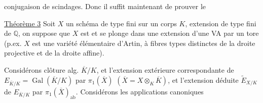 conjugaison de scindages. Donc il suffit maintenant de prouver le

\uline{Théorème 3} Soit $X$ un schéma de type fini sur un corps $K$, extension de type fini de $\mathbb Q$, on suppose que $X$ est   et se plonge dans une extension d'une VA par un tore (p.ex. $X$ est une variété élémentaire d'Artin, à fibres types  distinctes de la droite projective et de la droite affine).


Considérons   clôture alg. $\overline K/K$, et  l'extension extérieure correspondante  de $E_{\overline K/K}=\operatorname{Gal}(\overline K/K)$ par $\pi_1(\overline X)$ $(\overline X=X\otimes_K\overline K)$, et l'extension déduite $\widetilde E_{X/K}$ de $E_{\overline K/K}$ par $\pi_1(\overline X)_{\mathrm{ab}}$. Considérons les applications canoniques
